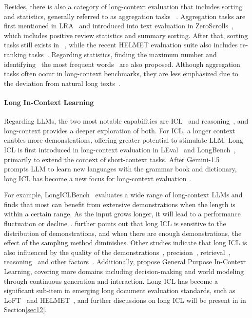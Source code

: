 Besides, there is also a category of long-context evaluation that includes sorting and statistics, generally referred to as aggregation tasks ~\citep{shaham2023zeroscrolls,hsieh2024ruler}. Aggregation tasks are first mentioned in LRA~\citep{taylong} and introduced into text evaluation in ZeroScrolls~\citep{shaham2023zeroscrolls}, which includes positive review statistics and summary sorting. After that, sorting tasks still exists in ~\citep{dong2024bamboo,li2023loogle,zhang2023marathon,zhang2024bench,wang2024ada}, while the recent HELMET evaluation suite also includes re-ranking tasks~\citep{yen2024helmet}. Regarding statistics, finding the maximum number and identifying~\citep{zhang2024bench} the most frequent words~\citep{hsieh2024ruler} are also proposed. Although aggregation tasks often occur in long-context benchmarks, they are less emphasized due to the deviation from natural long texts~\citep{hsieh2024ruler}.

\paragraph{Long In-Context Learning} Regarding LLMs, the two most notable capabilities are ICL~\citep{brown2020language,pan2023context} and reasoning~\citep{wei2022chain}, and long-context provides a deeper exploration of both. For ICL, a longer context enables more demonstrations, offering greater potential to stimulate LLM. Long ICL is first introduced in long-context evaluation in LEval~\citep{an2023eval} and LongBench~\citep{bai2023longbench}, primarily to extend the context of short-context tasks. After Gemini-1.5~\citep{reid2024gemini} prompts LLM to learn new languages with the grammar book and dictionary, long ICL has become a new focus for long-context evaluation~\citep{li2024long,agarwal2024many}. 

For example, LongICLBench~\citep{li2024long} evaluates a wide range of long-context LLMs and finds that most can benefit from extensive demonstrations when the length is within a certain range. As the input grows longer, it will lead to a performance fluctuation or decline~\citep{li2024long}. \citet{bertsch2024context} further points out that long ICL is sensitive to the distribution of demonstrations, and when there are enough demonstrations, the effect of the sampling method diminishes. Other studies indicate that long ICL is also influenced by the quality of the demonstrations~\citep{li2024demonstrations,agarwal2024many}, precision~\citep{wang2024precision}, retrieval~\citep{zou2024retrieval}, reasoning~\citep{kai2025mirbench} and other factors~\citep{agarwal2024many}. Additionally, \citet{wang2024benchmarking} propose General Purpose In-Context Learning, covering more domains including decision-making and world modeling through continuous generation and interaction. Long ICL has become a significant sub-item in emerging long document evaluation standards, such as LoFT~\citep{lee2024can} and HELMET~\citep{yen2024helmet}, and further discussions on long ICL will be present in \textbf{} in Section\ref{sec12}. 

